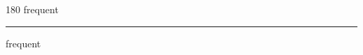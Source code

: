 
\begin{frame}
\begin{center}
\begin{turn}{180}
{\fontsize{2.5cm}{1em}\selectfont frequent}
\end{turn}
\vspace{1em}\par  
\hrule
\vspace{1em}\par  
{\fontsize{2.5cm}{1em}\selectfont frequent}
\end{center}
\end{frame}
